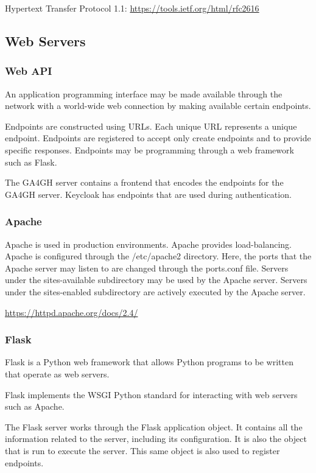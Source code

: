 \documentclass{article}
\begin{document}
Hypertext Transfer Protocol 1.1:
\url{https://tools.ietf.org/html/rfc2616}

\subsection{Web Servers}

\subsubsection{Web API}

An application programming interface may be made available through 
the network with a world-wide web connection by making available 
certain endpoints.

Endpoints are constructed using URLs. Each unique URL represents a unique endpoint. Endpoints are registered to accept only create endpoints and to provide specific responses. Endpoints may be programming through a web framework such as Flask.

The GA4GH server contains a frontend that encodes the endpoints
for the GA4GH server. Keycloak has endpoints that are used during authentication.

\subsubsection{Apache}

Apache is used in production environments.
Apache provides load-balancing.
Apache is configured through the /etc/apache2 directory.
Here, the ports that the Apache server may listen to
are changed through the ports.conf file.
Servers under the sites-available subdirectory
may be used by the Apache server.
Servers under the sites-enabled subdirectory
are actively executed by the Apache server.

\url{https://httpd.apache.org/docs/2.4/}

\subsubsection{Flask}

Flask is a Python web framework that allows
Python programs to be written that operate as web servers.

Flask implements the WSGI Python standard for interacting
with web servers such as Apache.

The Flask server works through the Flask application object. 
It contains all the information related to the server, including
its configuration.
It is also the object that is run to execute the server.
This same object is also used to register endpoints.
\end{document}
